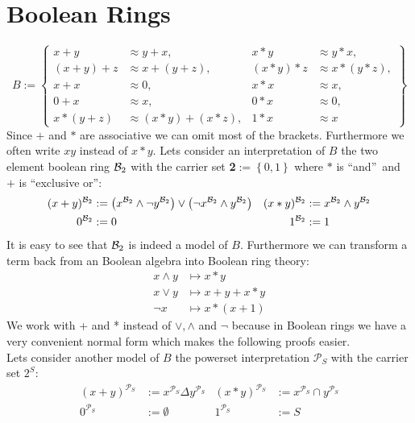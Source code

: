 \section{Boolean Rings}
\[B:=\left\lbrace 
	\begin{aligned}
		x+y     & \approx y+x,         & x*y     & \approx y*x,     \\
		(x+y)+z & \approx x+(y+z),     & (x*y)*z & \approx x*(y*z), \\
		x+x     & \approx 0,           & x*x     & \approx x,       \\
		0+x     & \approx x,           & 0*x     & \approx 0,       \\
		x*(y+z) & \approx (x*y)+(x*z), & 1*x     & \approx x        
	\end{aligned}
	\right\rbrace \]
	Since $+$ and $*$ are associative we can omit most of the brackets. Furthermore we often write $xy$ instead of $x*y$.
	Lets consider an interpretation of $B$ the two element boolean ring ${\mathcal{B}_2}$ with the carrier set \textbf{2}$:=\left\lbrace 0,1\right\rbrace$ where $*$ is \textquotedblleft and\textquotedblright\ and $+$ is \textquotedblleft exclusive or\textquotedblright:
	\begin{align*}
		(x+y)^{\mathcal{B}_2} & :=\left( x^{\mathcal{B}_2}\wedge\neg y^{\mathcal{B}_2}\right)  \vee \left( \neg x^{\mathcal{B}_2}\wedge y^{\mathcal{B}_2}\right) & (x*y)^{\mathcal{B}_2} & :=x^{\mathcal{B}_2}\wedge y^{\mathcal{B}_2} \\
		0^{\mathcal{B}_2}     & :=0                                 & 1^{\mathcal{B}_2} & :=1                                      
	\end{align*}
	It is easy to see that ${\mathcal{B}_2}$ is indeed a model of $B$. Furthermore we can transform a term back from an Boolean algebra into Boolean ring theory:
	\begin{align*}
		x \wedge y&\mapsto x*y\\
		x\vee y&\mapsto x+y+x*y\\
		\neg x&\mapsto x*(x+1)
	\end{align*}
	We work with + and * instead of $\vee,\wedge$ and $\neg$ because in Boolean rings we have a very convenient normal form which makes the following proofs easier.\\
	Lets consider another model of $B$ the powerset interpretation $\mathcal{P}_S$ with the carrier set $2^S$:
	\begin{align*}
		(x+y)^{\mathcal{P}_S} & :=x^{\mathcal{P}_S}\Delta y^{\mathcal{P}_S} & (x*y)^{\mathcal{P}_S} & :=x^{\mathcal{P}_S}\cap y^{\mathcal{P}_S} \\
		0^{\mathcal{P}_S}     & :=\emptyset                                 & 1^{\mathcal{P}_S} & :=S                                       
	\end{align*}
